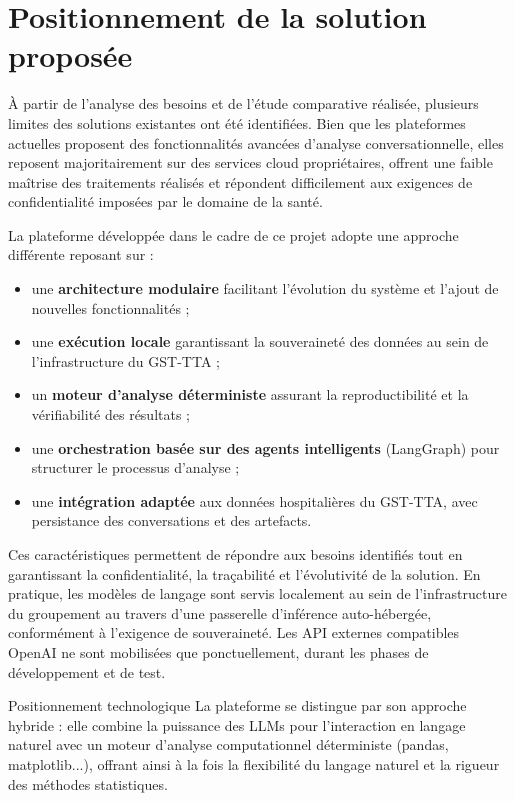 \section{Positionnement de la solution proposée}

À partir de l'analyse des besoins et de l'étude comparative réalisée, plusieurs limites des solutions existantes ont été identifiées. Bien que les plateformes actuelles proposent des fonctionnalités avancées d'analyse conversationnelle, elles reposent majoritairement sur des services cloud propriétaires, offrent une faible maîtrise des traitements réalisés et répondent difficilement aux exigences de confidentialité imposées par le domaine de la santé.

La plateforme développée dans le cadre de ce projet adopte une approche différente reposant sur :

\begin{itemize}
  \item une \textbf{architecture modulaire} facilitant l'évolution du système et l'ajout de nouvelles fonctionnalités ;
  \item une \textbf{exécution locale} garantissant la souveraineté des données au sein de l'infrastructure du GST-TTA ;
  \item un \textbf{moteur d'analyse déterministe} assurant la reproductibilité et la vérifiabilité des résultats ;
  \item une \textbf{orchestration basée sur des agents intelligents} (LangGraph) pour structurer le processus d'analyse ;
  \item une \textbf{intégration adaptée} aux données hospitalières du GST-TTA, avec persistance des conversations et des artefacts.
\end{itemize}

Ces caractéristiques permettent de répondre aux besoins identifiés tout en garantissant la confidentialité, la traçabilité et l'évolutivité de la solution.
En pratique, les modèles de langage sont servis localement au sein de l'infrastructure du groupement au travers d'une passerelle d'inférence auto-hébergée, conformément à l'exigence de souveraineté. Les API externes compatibles OpenAI ne sont mobilisées que ponctuellement, durant les phases de développement et de test.

\begin{infobox}{Positionnement technologique}
La plateforme se distingue par son approche hybride : elle combine la puissance des LLMs pour l'interaction en langage naturel avec un moteur d'analyse computationnel déterministe (pandas, matplotlib...), offrant ainsi à la fois la flexibilité du langage naturel et la rigueur des méthodes statistiques.
\end{infobox}
